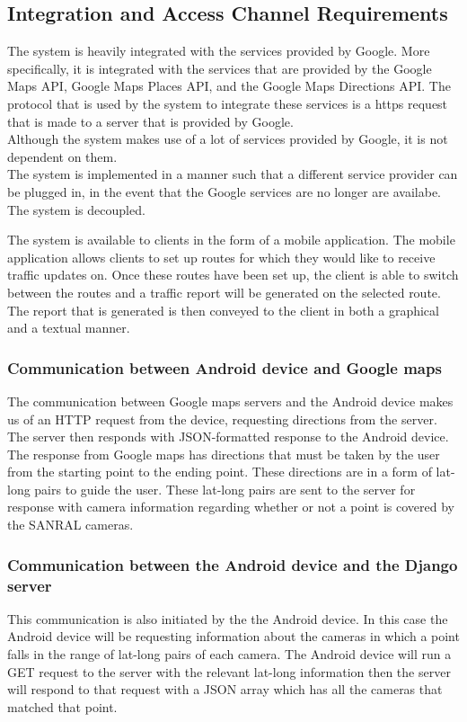\documentclass[a4paper,12pt]{article}
\begin{document}
\subsection{Integration and Access Channel Requirements}
The system is heavily integrated with the services provided by Google. More specifically, it is integrated with the services that are provided by the Google Maps API, Google Maps Places API, and the Google Maps Directions API. The protocol that is used by the system to integrate these services is a https request that is made to a server that is provided by Google. \\
Although the system makes use of a lot of services provided by Google, it is not dependent on them.\\
The system is implemented in a manner such that a different service provider can be plugged in, in the event that the Google services are no longer are availabe. The system is decoupled.

The system is available to clients in the form of a mobile application. The mobile application allows clients to set up routes for which they would like to receive traffic updates on. Once these routes have been set up, the client is able to switch between the routes and a traffic report will be generated on the selected route. The report that is generated is then conveyed to the client in both a graphical and a textual manner.

\subsubsection{Communication between Android device and Google maps}
The communication between Google maps servers and the Android device makes us of an HTTP request from the device, requesting directions from the server. The server then responds with JSON-formatted response to the Android device. The response from Google maps has directions that must be taken by the user from the starting point to the ending point. These directions are in a form of lat-long pairs to guide the user. These lat-long pairs are sent to the server for response with camera information regarding whether or not a point is covered by the SANRAL cameras.

\subsubsection{Communication between the Android device and the Django server}
This communication is also initiated by the the Android device. In this case the Android device will be requesting information about the cameras in which a point falls in the range of lat-long pairs of each camera. The Android device will run a GET request to the server with the relevant lat-long information then the server will respond to that request with a JSON array which has all the cameras that matched that point.
\end{document}
